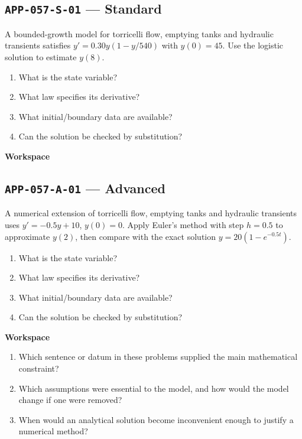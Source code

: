 \documentclass[11pt]{book}
\newcommand{\pid}[1]{\texttt{#1}}
\newcommand{\workspace}{\par\vspace{0.7in}\hrulefill\par\vspace{0.55in}\hrulefill\par}
\begin{document}
\subsection*{\pid{APP-057-S-01} — Standard}
\begin{problembox}
A bounded-growth model for torricelli flow, emptying tanks and hydraulic transients satisfies $y'=0.30y(1-y/540)$ with $y(0)=45$. Use the logistic solution to estimate $y(8)$.
\end{problembox}
\begin{promptbox}\begin{enumerate}
\item What is the state variable?
\item What law specifies its derivative?
\item What initial/boundary data are available?
\item Can the solution be checked by substitution?
\end{enumerate}\end{promptbox}
\textbf{Workspace}\workspace
{}
\subsection*{\pid{APP-057-A-01} — Advanced}
\begin{problembox}
A numerical extension of torricelli flow, emptying tanks and hydraulic transients uses $y'=-0.5y+10$, $y(0)=0$. Apply Euler's method with step $h=0.5$ to approximate $y(2)$, then compare with the exact solution $y=20(1-e^{-0.5t})$.
\end{problembox}
\begin{promptbox}\begin{enumerate}
\item What is the state variable?
\item What law specifies its derivative?
\item What initial/boundary data are available?
\item Can the solution be checked by substitution?
\end{enumerate}\end{promptbox}
\textbf{Workspace}\workspace
\begin{reflectionbox}\begin{enumerate}
\item Which sentence or datum in these problems supplied the main mathematical constraint?
\item Which assumptions were essential to the model, and how would the model change if one were removed?
\item When would an analytical solution become inconvenient enough to justify a numerical method?
\end{enumerate}\end{reflectionbox}
\end{document}
